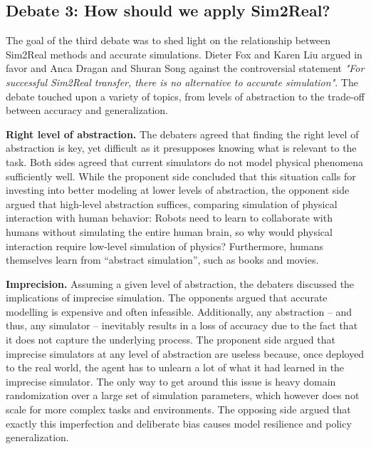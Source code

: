 \subsection{Debate 3: How should we apply Sim2Real?}

The goal of the third debate was to shed light on the relationship between Sim2Real methods and accurate simulations. Dieter Fox and Karen Liu argued in favor and Anca Dragan and Shuran Song against the controversial statement \emph{"For successful Sim2Real transfer, there is no alternative to accurate simulation"}. The debate touched upon a variety of topics, from levels of abstraction to the trade-off between accuracy and generalization. 


\textbf{Right level of abstraction.} The debaters agreed that finding the right level of abstraction is key, yet difficult as it presupposes knowing what is relevant to the task. Both sides agreed that current simulators do not model physical phenomena sufficiently well. While the proponent side concluded that this situation calls for investing into better modeling at lower levels of abstraction, the opponent side argued that high-level abstraction suffices, comparing simulation of physical interaction with human behavior: Robots need to learn to collaborate with humans without simulating the entire human brain, so why would physical interaction require low-level simulation of physics? Furthermore, humans themselves learn from ``abstract simulation'', such as books and movies. 

\textbf{Imprecision.} Assuming a given level of abstraction, the debaters discussed the implications of imprecise simulation. The opponents argued that accurate modelling is expensive and often infeasible. Additionally, any abstraction -- and thus, any simulator -- inevitably results in a loss of accuracy due to the fact that it does not capture the underlying process.
The proponent side argued that imprecise simulators at any level of abstraction are useless because, once deployed to the real world, the agent has to unlearn a lot of what it had learned in the imprecise simulator. The only way to get around this issue is heavy domain randomization over a large set of simulation parameters, which however does not scale for more complex tasks and environments. The opposing side argued that exactly this imperfection and deliberate bias causes model resilience and policy generalization.

